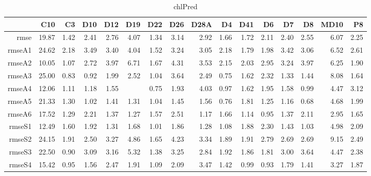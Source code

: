 \begin{table}[H]
\centering
\begin{tabular}{rrrrrrrrrrrrrrrr}
  \hline
 & C10 & C3 & D10 & D12 & D19 & D22 & D26 & D28A & D4 & D41 & D6 & D7 & D8 & MD10 & P8 \\ 
  \hline
rmse & 19.87 & 1.42 & 2.41 & 2.76 & 4.07 & 1.34 & 3.14 & 2.92 & 1.66 & 1.72 & 2.11 & 2.40 & 2.55 & 6.07 & 2.25 \\ 
  rmseA1 & 24.62 & 2.18 & 3.49 & 3.40 & 4.04 & 1.52 & 3.24 & 3.05 & 2.18 & 1.79 & 1.98 & 3.42 & 3.06 & 6.52 & 2.61 \\ 
  rmseA2 & 10.05 & 1.07 & 2.72 & 3.97 & 6.71 & 1.67 & 4.31 & 3.53 & 2.15 & 2.03 & 2.95 & 3.24 & 3.97 & 6.25 & 1.90 \\ 
  rmseA3 & 25.00 & 0.83 & 0.92 & 1.99 & 2.52 & 1.04 & 3.64 & 2.49 & 0.75 & 1.62 & 2.32 & 1.33 & 1.44 & 8.08 & 1.64 \\ 
  rmseA4 & 12.06 & 1.11 & 1.18 & 1.55 &  & 0.75 & 1.93 & 4.03 & 0.97 & 1.62 & 1.95 & 1.58 & 0.99 & 4.47 & 3.12 \\ 
  rmseA5 & 21.33 & 1.30 & 1.02 & 1.41 & 1.31 & 1.04 & 1.45 & 1.56 & 0.76 & 1.81 & 1.25 & 1.16 & 0.68 & 4.68 & 1.99 \\ 
  rmseA6 & 17.52 & 1.29 & 2.21 & 1.37 & 1.27 & 1.57 & 2.51 & 1.17 & 1.66 & 1.14 & 0.95 & 1.37 & 2.11 & 2.95 & 1.65 \\ 
  rmseS1 & 12.49 & 1.60 & 1.92 & 1.31 & 1.68 & 1.01 & 1.86 & 1.28 & 1.08 & 1.88 & 2.30 & 1.43 & 1.03 & 4.98 & 2.09 \\ 
  rmseS2 & 24.15 & 1.91 & 2.50 & 3.27 & 4.86 & 1.65 & 4.23 & 3.34 & 1.89 & 1.91 & 2.79 & 2.69 & 2.69 & 9.15 & 2.49 \\ 
  rmseS3 & 22.50 & 0.90 & 3.09 & 3.16 & 5.32 & 1.38 & 3.25 & 2.84 & 1.92 & 1.86 & 1.81 & 3.00 & 3.64 & 4.47 & 2.38 \\ 
  rmseS4 & 15.42 & 0.95 & 1.56 & 2.47 & 1.91 & 1.09 & 2.09 & 3.47 & 1.42 & 0.99 & 0.93 & 1.79 & 1.41 & 3.27 & 1.87 \\ 
   \hline
\end{tabular}
\caption{chlPred} 
\end{table}
